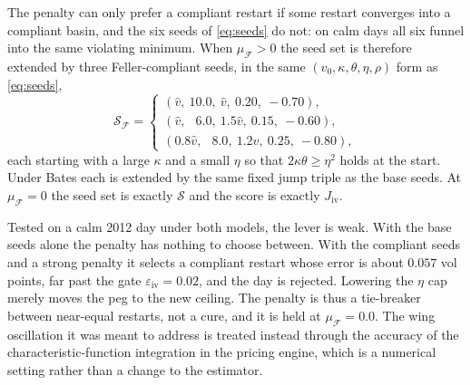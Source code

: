 \documentclass[a4paper, 11pt, reqno]{amsart}
\newcommand{\ConstIvGateSym}{\varepsilon_{\mathrm{iv}}}  \newcommand{\ConstIvGateVal}{0.02}
\newcommand{\ConstFellerPenaltySym}{\mu_{\mathcal{F}}}   \newcommand{\ConstFellerPenaltyVal}{0.0}
\begin{document}
		The penalty can only prefer a compliant restart if some restart converges into a compliant basin,
		and the six seeds of \eqref{eq:seeds} do not: on calm days all six funnel into the same violating
		minimum. When $\ConstFellerPenaltySym>0$ the seed set is therefore extended by three Feller-compliant
		seeds, in the same $(v_0,\kappa,\theta,\eta,\rho)$ form as \eqref{eq:seeds},
		\begin{equation}\label{eq:feller-seeds}
			\mathcal{S}_{\mathcal{F}} =
			\begin{cases}
				(\hat v,\ 10.0,\ \hat v,\ 0.20,\ -0.70), \\
				(\hat v,\ \phantom{1}6.0,\ 1.5\hat v,\ 0.15,\ -0.60), \\
				(0.8\hat v,\ \phantom{1}8.0,\ 1.2\hat v,\ 0.25,\ -0.80),
			\end{cases}
		\end{equation}
		each starting with a large $\kappa$ and a small $\eta$ so that $2\kappa\theta\ge\eta^2$ holds at
		the start. Under Bates each is extended by the same fixed jump triple as the base seeds. At
		$\ConstFellerPenaltySym=0$ the seed set is exactly $\mathcal{S}$ and the score is exactly
		$J_{\mathrm{iv}}$.

		Tested on a calm 2012 day under both models, the lever is weak. With the base seeds alone the
		penalty has nothing to choose between. With the compliant seeds and a strong penalty it selects a
		compliant restart whose error is about $0.057$ vol points, far past the gate
		$\ConstIvGateSym=\ConstIvGateVal$, and the day is rejected. Lowering the $\eta$ cap merely moves
		the peg to the new ceiling. The penalty is thus a tie-breaker between near-equal restarts, not a
		cure, and it is held at $\ConstFellerPenaltySym=\ConstFellerPenaltyVal$. The wing oscillation it
		was meant to address is treated instead through the accuracy of the characteristic-function
		integration in the pricing engine, which is a numerical setting rather than a change to the
		estimator.
\end{document}
